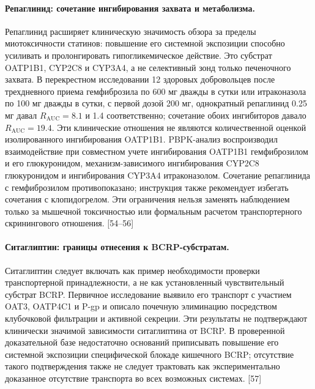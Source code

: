 \documentclass[11pt]{article}
\begin{document}
\paragraph{Репаглинид: сочетание ингибирования захвата и метаболизма.}
Репаглинид расширяет клиническую значимость обзора за пределы миотоксичности статинов: повышение его системной экспозиции способно усиливать и пролонгировать гипогликемическое действие. Это субстрат OATP1B1, CYP2C8 и CYP3A4, а не селективный зонд только печеночного захвата. В перекрестном исследовании 12 здоровых добровольцев после трехдневного приема гемфиброзила по 600 мг дважды в сутки или итраконазола по 100 мг дважды в сутки, с первой дозой 200 мг, однократный репаглинид 0.25 мг давал \(R_{\mathrm{AUC}}=8.1\) и 1.4 соответственно; сочетание обоих ингибиторов давало \(R_{\mathrm{AUC}}=19.4\). Эти клинические отношения не являются количественной оценкой изолированного ингибирования OATP1B1. PBPK-анализ воспроизводил взаимодействие при совместном учете ингибирования OATP1B1 гемфиброзилом и его глюкуронидом, механизм-зависимого ингибирования CYP2C8 глюкуронидом и ингибирования CYP3A4 итраконазолом. Сочетание репаглинида с гемфиброзилом противопоказано; инструкция также рекомендует избегать сочетания с клопидогрелом. Эти ограничения нельзя заменять наблюдением только за мышечной токсичностью или формальным расчетом транспортерного скринингового отношения. [54--56]

\paragraph{Ситаглиптин: границы отнесения к BCRP-субстратам.}
Ситаглиптин следует включать как пример необходимости проверки транспортерной принадлежности, а не как установленный чувствительный субстрат BCRP. Первичное исследование выявило его транспорт с участием OAT3, OATP4C1 и P-gp и описало почечную элиминацию посредством клубочковой фильтрации и активной секреции. Эти результаты не подтверждают клинически значимой зависимости ситаглиптина от BCRP. В проверенной доказательной базе недостаточно оснований приписывать повышение его системной экспозиции специфической блокаде кишечного BCRP; отсутствие такого подтверждения также не следует трактовать как экспериментально доказанное отсутствие транспорта во всех возможных системах. [57]
\end{document}
